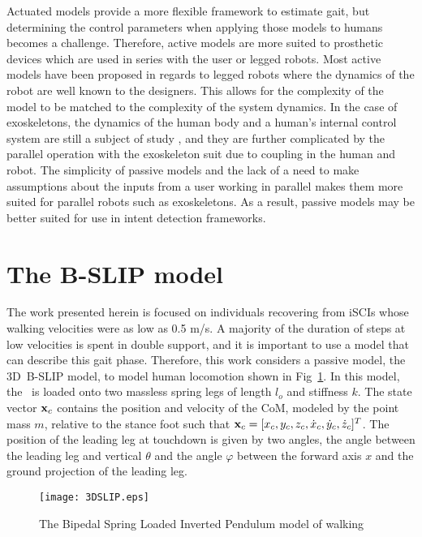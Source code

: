 Actuated models provide a more flexible framework to estimate gait, but determining the control parameters when applying those models to humans becomes a challenge. Therefore, active models are more suited to prosthetic devices which are used in series with the user or legged robots. Most active models have been proposed in regards to legged robots where the dynamics of the robot are well known to the designers. This allows for the complexity of the model to be matched to the complexity of the system dynamics. In the case of exoskeletons, the dynamics of the human body and a human's internal control system are still a subject of study \cite{wolpert1998internal, dounskaia2005internal, kording2007decision}, and they are further complicated by the parallel operation with the exoskeleton suit due to coupling in the human and robot. The simplicity of passive models and the lack of a need to make assumptions about the inputs from a user working in parallel makes them more suited for parallel robots such as exoskeletons. As a result, passive models may be better suited for use in intent detection frameworks. 

\section{The B-SLIP model}\label{sec:bslip_model}
The work presented herein is focused on individuals recovering from iSCIs whose walking velocities were as low as 0.5 m/s. A majority of the duration of steps at low velocities is spent in double support, and it is important to use a model that can describe this gait phase. Therefore, this work considers a passive model, the 3D~B-SLIP model, to model human locomotion shown in Fig~\ref{fig:slip}. In this model, the \COM~is loaded onto two massless spring legs of length $ l_o $ and stiffness $ k $. The state vector $ \mathbf{x}_{c} $ contains the position and velocity of the CoM, modeled by the point mass $ m $, relative to the stance foot such that $ \mathbf{x}_{c} = [x_{c} ,y_{c} ,z_{c} ,\dot{x}_{c} ,\dot{y}_{c} ,\dot{z}_{c}]^T $. The position of the leading leg at touchdown is given by two angles, the angle between the leading leg and vertical $ \theta $ and the angle $ \varphi $ between the forward axis $ x $  and the ground projection of the leading leg.
%
\begin{figure}
	\centering
	\texttt{[image: 3DSLIP.eps]}
	\caption[The Bipedal Spring Loaded Inverted Pendulum]{The Bipedal Spring Loaded Inverted Pendulum \cite{liu2015dynamic} model of walking}\label{fig:slip}
\end{figure}
%

